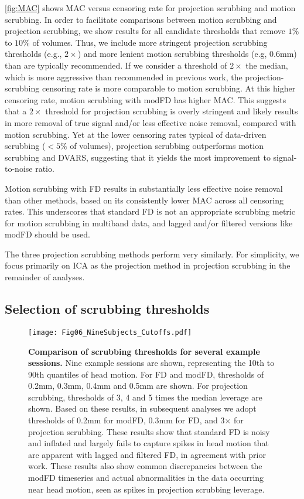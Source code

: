 \documentclass{article}
\begin{document}
\autoref{fig:MAC} shows MAC versus censoring rate for projection scrubbing and motion scrubbing. In order to facilitate comparisons between motion scrubbing and projection scrubbing, we show results for all candidate thresholds that remove $1\%$ to $10\%$ of volumes. Thus, we include more stringent projection scrubbing thresholds (e.g., $2\times$) and more lenient motion scrubbing thresholds (e.g, 0.6mm) than are typically recommended. If we consider a threshold of $2\times$ the median, which is more aggressive than recommended in previous work, the projection-scrubbing censoring rate is more comparable to motion scrubbing. At this higher censoring rate, motion scrubbing with modFD has higher MAC. This suggests that a $2\times$ threshold for projection scrubbing is overly stringent and likely results in more removal of true signal and/or less effective noise removal, compared with motion scrubbing. Yet at the lower censoring rates typical of data-driven scrubbing ($<5\%$ of volumes), projection scrubbing outperforms motion scrubbing and DVARS, suggesting that it yields the most improvement to signal-to-noise ratio.

Motion scrubbing with FD results in substantially less effective noise removal than other methods, based on its consistently lower MAC across all censoring rates. This underscores that standard FD is not an appropriate scrubbing metric for motion scrubbing in multiband data, and lagged and/or filtered versions like modFD should be used.

The three projection scrubbing methods perform very similarly. For simplicity, we focus primarily on ICA as the projection method in projection scrubbing in the remainder of analyses.

\subsection{Selection of scrubbing thresholds}\label{sec:thresholds}

\begin{figure}
    \centering
    \texttt{[image: Fig06\_NineSubjects\_Cutoffs.pdf]}
    \caption{\small \textbf{Comparison of scrubbing thresholds for several example sessions.} Nine example sessions are shown, representing the 10th to 90th quantiles of head motion. For FD and modFD, thresholds of 0.2mm, 0.3mm, 0.4mm and 0.5mm are shown. For projection scrubbing, thresholds of 3, 4 and 5 times the median leverage are shown. Based on these results, in subsequent analyses we adopt thresholds of 0.2mm for modFD, 0.3mm for FD, and 3$\times$ for projection scrubbing. These results show that standard FD is noisy and inflated and largely fails to capture spikes in head motion that are apparent with lagged and filtered FD, in agreement with prior work. These results also show common discrepancies between the modFD timeseries and actual abnormalities in the data occurring near head motion, seen as spikes in projection scrubbing leverage.}
    \label{fig:NineSubjects}
\end{figure}
\end{document}
